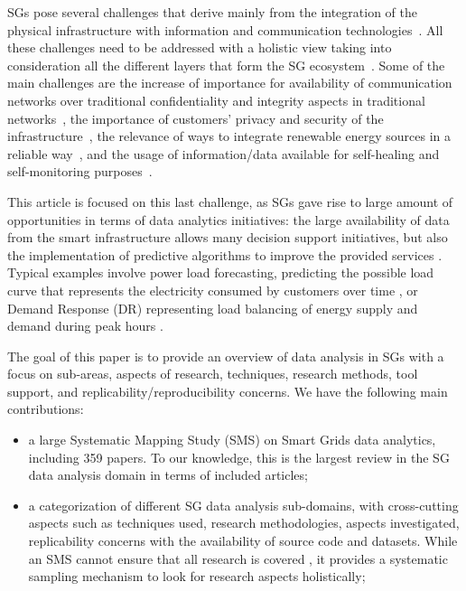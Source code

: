\documentclass[journal]{IEEEtran}
\begin{document}
SGs pose several challenges that derive mainly from the integration of the physical infrastructure with information and communication technologies~\cite{ref:cen2012group}. All these challenges need to be addressed with a holistic view taking into consideration all the different layers that form the SG ecosystem~\cite{ref:cen2012group}. Some of the main challenges are the increase of importance for availability of communication networks over traditional confidentiality and integrity aspects in traditional networks~\cite{ref:ancillotti2013role}, the importance of customers' privacy and security of the infrastructure~\cite{ref:mcdaniel2009security}, the relevance of ways to integrate renewable energy sources in a reliable way~\cite{ref:wolsink2012research}, and the usage of information/data available for self-healing and self-monitoring purposes~\cite{ref:amin2008challenges, ref:farhangi2010path,ref:amin2005toward}.

This article is focused on this last challenge, as SGs gave rise to large amount of opportunities in terms of data analytics initiatives: the large availability of data from the smart infrastructure allows many decision support initiatives, but also the implementation of predictive algorithms to improve the provided services \cite{ref:rossi2016anomaly}. Typical examples involve power load forecasting, predicting the  possible load curve that represents the electricity consumed by customers over time , or Demand Response (DR) representing load balancing of energy supply and demand during peak hours .

The goal of this paper is to provide an overview of data analysis in SGs with a focus on sub-areas, aspects of research, techniques, research methods, tool support, and replicability/reproducibility concerns. We have the following main contributions:
\begin{itemize}
\item a large Systematic Mapping Study (SMS) \cite{ref:petersen2008systematic,ref:barn2017conductingsms} on Smart Grids data analytics, including 359 papers. To our knowledge, this is the largest review in the SG data analysis domain in terms of included articles;
\item a categorization of different SG data analysis sub-domains, with cross-cutting aspects such as techniques used, research methodologies, aspects investigated, replicability concerns with the availability of source code and datasets. While an SMS cannot ensure that all research is covered \cite{ref:budgen2006performing}, it provides a systematic sampling mechanism to look for research aspects holistically;
\end{itemize}
\end{document}

